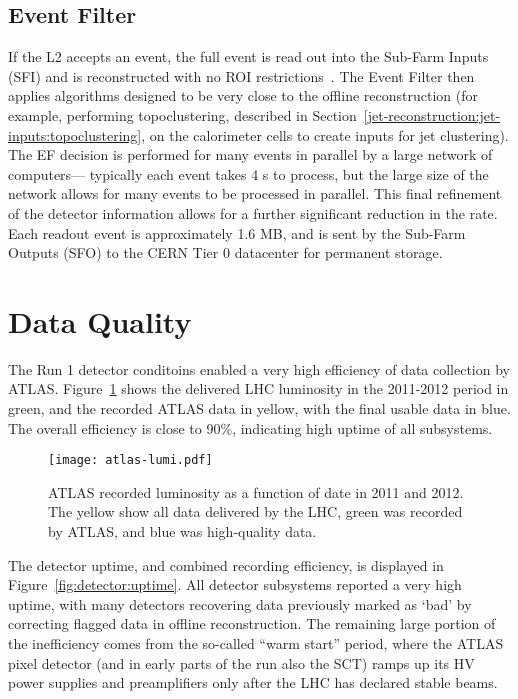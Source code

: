 \subsection{Event Filter}

If the L2 accepts an event, the full event is read out into the Sub-Farm Inputs (SFI) and is reconstructed with no ROI restrictions~\cite{ATLASPaper}. The Event Filter then applies algorithms designed to be very close to the offline reconstruction (for example, performing topoclustering, described in Section~\ref{jet-reconstruction:jet-inputs:topoclustering}, on the calorimeter cells to create inputs for jet clustering). The EF decision is performed for many events in parallel by a large network of computers--- typically each event takes 4 s to process, but the large size of the network allows for many events to be processed in parallel. This final refinement of the detector information allows for a further significant reduction in the rate. Each readout event is approximately 1.6 MB, and is sent by the Sub-Farm Outputs (SFO) to the CERN Tier 0 datacenter for permanent storage.


\section{Data Quality}
\label{atlas:data-quality}

The Run 1 detector conditoins enabled a very high efficiency of data collection by ATLAS. Figure~\ref{fig:detector:lumi} shows the delivered LHC luminosity in the 2011-2012 period in green, and the recorded ATLAS data in yellow, with the final usable data in blue. The overall efficiency is close to 90$\%$, indicating high uptime of all subsystems.


\begin{figure}
\centering
\texttt{[image: atlas-lumi.pdf]}
\label{fig:detector:lumi}
\caption{ATLAS recorded luminosity as a function of date in 2011 and 2012. The yellow show all data delivered by the LHC, green was recorded by ATLAS, and blue was high-quality data.}
\end{figure}


The detector uptime, and combined recording efficiency, is displayed in Figure~\ref{fig:detector:uptime}. All detector subsystems reported a very high uptime, with many detectors recovering data previously marked as `bad' by correcting flagged data in offline reconstruction. The remaining large portion of the inefficiency comes from the so-called ``warm start'' period, where the ATLAS pixel detector (and in early parts of the run also the SCT) ramps up its HV power supplies and preamplifiers only after the LHC has declared stable beams.

